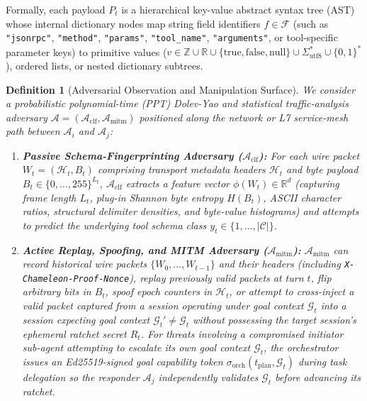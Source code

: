 \documentclass[conference,10pt]{IEEEtran}
\newtheorem{definition}{Definition}
\begin{document}
Formally, each payload $P_t$ is a hierarchical key-value abstract syntax tree (AST) whose internal dictionary nodes map string field identifiers $f \in \mathcal{F}$ (such as \texttt{"jsonrpc"}, \texttt{"method"}, \texttt{"params"}, \texttt{"tool\_name"}, \texttt{"arguments"}, or tool-specific parameter keys) to primitive values ($v \in \mathbb{Z} \cup \mathbb{R} \cup \{\text{true}, \text{false}, \text{null}\} \cup \Sigma_{\text{utf8}}^* \cup \{0,1\}^*$), ordered lists, or nested dictionary subtrees.

\begin{definition}[Adversarial Observation and Manipulation Surface]
\label{def:threat}
We consider a probabilistic polynomial-time (PPT) Dolev-Yao and statistical traffic-analysis adversary $\mathcal{A} = (\mathcal{A}_{\text{clf}}, \mathcal{A}_{\text{mitm}})$ positioned along the network or L7 service-mesh path between $\mathcal{A}_i$ and $\mathcal{A}_j$:
\begin{enumerate}
    \item \textbf{Passive Schema-Fingerprinting Adversary ($\mathcal{A}_{\text{clf}}$):} For each wire packet $W_t = (\mathcal{H}_t, B_t)$ comprising transport metadata headers $\mathcal{H}_t$ and byte payload $B_t \in \{0,\dots,255\}^{L_t}$, $\mathcal{A}_{\text{clf}}$ extracts a feature vector $\phi(W_t) \in \mathbb{R}^d$ (capturing frame length $L_t$, plug-in Shannon byte entropy $H(B_t)$, ASCII character ratios, structural delimiter densities, and byte-value histograms) and attempts to predict the underlying tool schema class $y_t \in \{1,\dots,|\mathcal{C}|\}$.
    \item \textbf{Active Replay, Spoofing, and MITM Adversary ($\mathcal{A}_{\text{mitm}}$):} $\mathcal{A}_{\text{mitm}}$ can record historical wire packets $\{W_0, \dots, W_{t-1}\}$ and their headers (including \texttt{X-Chameleon-Proof-Nonce}), replay previously valid packets at turn $t$, flip arbitrary bits in $B_t$, spoof epoch counters in $\mathcal{H}_t$, or attempt to cross-inject a valid packet captured from a session operating under goal context $\mathcal{G}_t$ into a session expecting goal context $\mathcal{G}_t' \ne \mathcal{G}_t$ without possessing the target session's ephemeral ratchet secret $R_t$. For threats involving a compromised initiator sub-agent attempting to escalate its own goal context $\mathcal{G}_t$, the orchestrator issues an Ed25519-signed goal capability token $\sigma_{\text{orch}}(t_{\text{plan}}, \mathcal{G}_t)$ during task delegation so the responder $\mathcal{A}_j$ independently validates $\mathcal{G}_t$ before advancing its ratchet.
\end{enumerate}
\end{definition}
\end{document}
